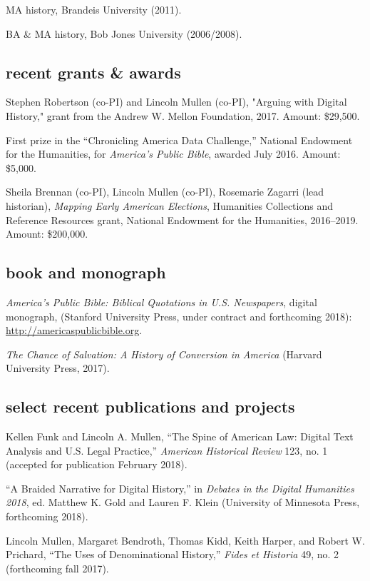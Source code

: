 \documentclass[11pt]{article}
\begin{document}
MA history, Brandeis University (2011).

BA \& MA history, Bob Jones University (2006/2008).

\subsection{recent grants \& awards}

Stephen Robertson (co-PI) and Lincoln Mullen (co-PI), "Arguing with Digital 
History," grant from the Andrew W. Mellon Foundation, 2017. Amount: \$29,500.

First prize in the ``Chronicling America Data Challenge,'' National Endowment 
for the Humanities, for \emph{America's Public Bible}, awarded July 2016. 
Amount: \$5,000.

Sheila Brennan (co-PI), Lincoln Mullen (co-PI), Rosemarie Zagarri (lead 
historian), \emph{Mapping Early American Elections}, Humanities Collections 
and Reference Resources grant, National Endowment for the Humanities, 
2016--2019. Amount: \$200,000. 

\subsection{book and monograph}

\emph{America's Public Bible: Biblical Quotations in U.S. Newspapers},
digital monograph, (Stanford University Press, under contract and forthcoming 
2018): \url{http://americaspublicbible.org}.

\emph{The Chance of Salvation: A History of Conversion in America} (Harvard 
University Press, 2017).

\subsection{select recent publications and projects}

Kellen Funk and Lincoln A. Mullen, ``The Spine of American Law: Digital Text 
Analysis and U.S. Legal Practice,'' \emph{American Historical Review} 123, no. 1 (accepted for publication February 2018). 

``A Braided Narrative for Digital History,'' in \emph{Debates in the Digital 
  Humanities 2018}, ed. Matthew K. Gold and Lauren F. Klein (University of 
Minnesota Press, forthcoming 2018).

Lincoln Mullen, Margaret Bendroth, Thomas Kidd, Keith Harper, and Robert W. 
Prichard, ``The Uses of Denominational History,'' \emph{Fides et Historia} 49, 
no. 2 (forthcoming fall 2017).
\end{document}
